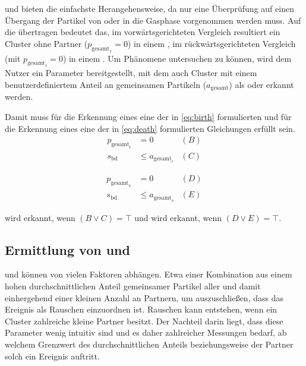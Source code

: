  und  bieten die einfachste Herangehensweise, da nur eine Überprüfung auf einen Übergang der Partikel von oder in die Gasphase vorgenommen werden muss. Auf die  übertragen bedeutet das, im vorwärtsgerichteten Vergleich resultiert ein Cluster ohne Partner ($p_{\text{gesamt}_\text{v}} = 0$) in einem , im rückwärtsgerichteten Vergleich (mit $p_{\text{gesamt}_\text{r}} = 0$) in einem . Um Phänomene untersuchen zu können, wird dem Nutzer ein Parameter  bereitgestellt, mit dem auch Cluster mit einem benutzerdefiniertem Anteil an gemeinsamen Partikeln ($a_\text{gesamt}$) als  oder  erkannt werden.

Damit muss für die Erkennung eines  eine der in \autoref{eq:birth} formulierten und für die Erkennung eines  eine der in  \autoref{eq:death} formulierten Gleichungen erfüllt sein.
\begin{equation}
	\begin{aligned}\label{eq:birth}
		p_{\text{gesamt}_\text{r}} &= 0 &(B)\\
		s_\text{bd} &\le a_{\text{gesamt}_r} &(C)
	\end{aligned}
\end{equation}

\begin{equation}
	\begin{aligned}\label{eq:death}
		p_{\text{gesamt}_\text{v}} &= 0 &(D)\\
		s_\text{bd} &\le a_{\text{gesamt}_v} &(E)
\end{aligned}
\end{equation}

 wird erkannt, wenn $(B \lor C) = \top$ und  wird erkannt, wenn $(D \lor E) = \top$.

\subsection*{Ermittlung von  und }
 und  können von vielen Faktoren abhängen. Etwa einer Kombination aus einem hohen durchschnittlichen Anteil gemeinsamer Partikel aller  und damit einhergehend einer kleinen Anzahl an Partnern, um auszuschließen, dass das Ereignis als Rauschen einzuordnen ist. Rauschen kann entstehen, wenn ein Cluster zahlreiche kleine Partner besitzt.
Der Nachteil darin liegt, dass diese Parameter wenig intuitiv sind und es daher zahlreicher Messungen bedarf, ab welchem Grenzwert des durchschnittlichen Anteils beziehungsweise der Partner solch ein Ereignis auftritt.

